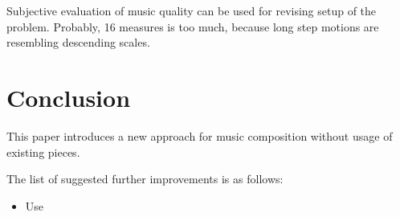 \documentclass{article}
\begin{document}
Subjective evaluation of music quality can be used for revising setup of the problem. Probably, 16 measures is too much, because long step motions are resembling descending scales.


\section{Conclusion}
\label{sec:conclusion}

This paper introduces a new approach for music composition without usage of existing pieces.

The list of suggested further improvements is as follows:
\begin{itemize}
	\item Use 
\end{itemize}


  

\end{document}
